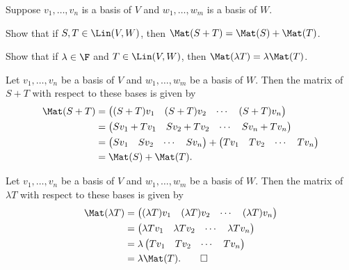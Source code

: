 \begin{exc}
\begin{exercise}
Suppose $v_1,\dots,v_n$ is a basis of $V$ and $w_1,\dots,w_m$ is a basis of
$W$.
\begin{parts}
\item Show that if $S,T\in\Lin(V,W)$, then $\Mat(S+T)=\Mat(S)+\Mat(T)$.
\item Show that if $\lambda\in\F$ and $T\in\Lin(V,W)$, then
  $\Mat(\lambda T)=\lambda\Mat(T)$.
\end{parts}
\end{exercise}
\begin{solution}\leavevmode
\begin{parts}
\item Let $v_1,\dots,v_n$ be a basis of $V$ and $w_1,\dots,w_m$ be a basis of
  $W$. Then the matrix of $S+T$ with respect to these bases is given by
  \begin{align*}
  \Mat(S+T) &= \begin{pmatrix} (S+T)v_1 & (S+T)v_2 & \cdots & (S+T)v_n
               \end{pmatrix}\\
   &= \begin{pmatrix} Sv_1+Tv_1 & Sv_2+Tv_2 & \cdots & Sv_n+Tv_n
      \end{pmatrix}\\
   &= \begin{pmatrix} Sv_1 & Sv_2 & \cdots & Sv_n \end{pmatrix}
      + \begin{pmatrix} Tv_1 & Tv_2 & \cdots & Tv_n \end{pmatrix}\\
   &= \Mat(S)+\Mat(T).
  \end{align*}
\item Let $v_1,\dots,v_n$ be a basis of $V$ and $w_1,\dots,w_m$ be a basis of
  $W$. Then the matrix of $\lambda T$ with respect to these bases is given by
  \begin{align*}
  \Mat(\lambda T) &= \begin{pmatrix} (\lambda T)v_1 & (\lambda T)v_2 & \cdots
                     & (\lambda T)v_n \end{pmatrix}\\
   &= \begin{pmatrix} \lambda Tv_1 & \lambda Tv_2 & \cdots & \lambda Tv_n
      \end{pmatrix}\\
   &= \lambda\begin{pmatrix} Tv_1 & Tv_2 & \cdots & Tv_n \end{pmatrix}\\
   &= \lambda\Mat(T). \qedhere
  \end{align*}
\end{parts}
\end{solution}


\end{exc}
